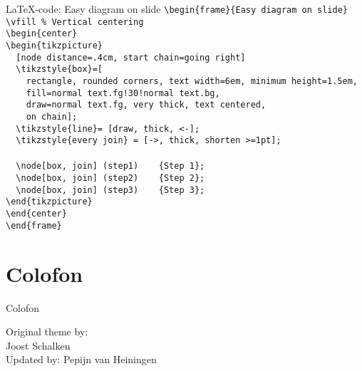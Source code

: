 \toggleslidecolors
\begin{frame}[fragile]{\LaTeX-code: Easy diagram on slide}
\scriptsize
\verb|\begin{frame}{Easy diagram on slide}|\\
\verb|\vfill % Vertical centering|\\
\verb|\begin{center}|\\
\verb|\begin{tikzpicture}|\\
\verb|  [node distance=.4cm, start chain=going right]|\\
\verb|  \tikzstyle{box}=[|\\
\verb|    rectangle, rounded corners, text width=6em, minimum height=1.5em,|\\
\verb|    fill=normal text.fg!30!normal text.bg,|\\
\verb|    draw=normal text.fg, very thick, text centered,|\\
\verb|    on chain];|\\
\verb|  \tikzstyle{line}= [draw, thick, <-];|\\
\verb|  \tikzstyle{every join} = [->, thick, shorten >=1pt];|\\
\verb||\\
\verb|  \node[box, join] (step1)	{Step 1};|\\
\verb|  \node[box, join] (step2)	{Step 2};|\\
\verb|  \node[box, join] (step3)	{Step 3};|\\
\verb|\end{tikzpicture}|\\
\verb|\end{center}|\\
\verb|\end{frame}|\\
\end{frame}
\toggleslidecolors



\section{Colofon}


\begin{frame}{Colofon}
\vfill %
\begin{center}
\alert{\large Original theme by:}\\
{\LARGE Joost Schalken}\\
{\tiny Updated by: Pepijn van Heiningen}
\end{center}
\end{frame}

